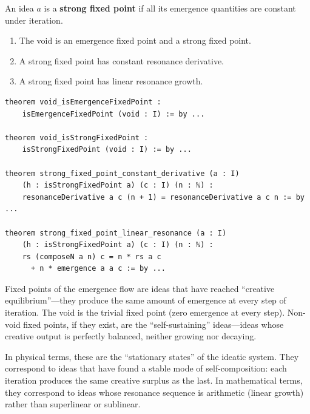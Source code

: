 \begin{definition}
\label{def:strong-fixed-point}
An idea $a$ is a \textbf{strong fixed point} if all its emergence quantities
are constant under iteration.
\end{definition}

\begin{theorem}
\label{thm:fixed-point}
\begin{enumerate}
  \item The void is an emergence fixed point and a strong fixed point.
  \item A strong fixed point has constant resonance derivative.
  \item A strong fixed point has linear resonance growth.
\end{enumerate}
\end{theorem}

\begin{lstlisting}[caption={Fixed points (IDT\_v3\_Emergence.lean)}]
theorem void_isEmergenceFixedPoint :
    isEmergenceFixedPoint (void : I) := by ...

theorem void_isStrongFixedPoint :
    isStrongFixedPoint (void : I) := by ...

theorem strong_fixed_point_constant_derivative (a : I)
    (h : isStrongFixedPoint a) (c : I) (n : ℕ) :
    resonanceDerivative a c (n + 1) = resonanceDerivative a c n := by ...

theorem strong_fixed_point_linear_resonance (a : I)
    (h : isStrongFixedPoint a) (c : I) (n : ℕ) :
    rs (composeN a n) c = n * rs a c
      + n * emergence a a c := by ...
\end{lstlisting}

\begin{interpretation}
Fixed points of the emergence flow are ideas that have reached ``creative
equilibrium''---they produce the same amount of emergence at every step of
iteration. The void is the trivial fixed point (zero emergence at every step).
Non-void fixed points, if they exist, are the ``self-sustaining'' ideas---ideas
whose creative output is perfectly balanced, neither growing nor decaying.

In physical terms, these are the ``stationary states'' of the ideatic system.
They correspond to ideas that have found a stable mode of self-composition:
each iteration produces the same creative surplus as the last. In mathematical
terms, they correspond to ideas whose resonance sequence is arithmetic (linear
growth) rather than superlinear or sublinear.
\end{interpretation}

